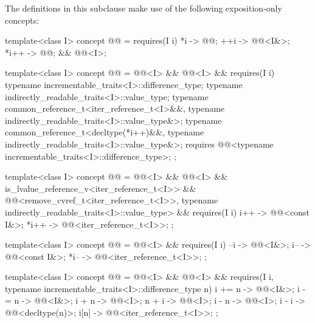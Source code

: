 \pnum
The definitions in this subclause make use of the following
exposition-only concepts:
\begin{codeblock}
template<class I>
concept @@ =
  requires(I i) {
    {   *i } -> @@;
    {  ++i } -> @@<I&>;
    { *i++ } -> @@;
  } && @@<I>;

template<class I>
concept @@ =
  @@<I> && @@<I> && requires(I i) {
    typename incrementable_traits<I>::difference_type;
    typename indirectly_readable_traits<I>::value_type;
    typename common_reference_t<iter_reference_t<I>&&,
                                typename indirectly_readable_traits<I>::value_type&>;
    typename common_reference_t<decltype(*i++)&&,
                                typename indirectly_readable_traits<I>::value_type&>;
    requires @@<typename incrementable_traits<I>::difference_type>;
  };

template<class I>
concept @@ =
  @@<I> && @@<I> &&
  is_lvalue_reference_v<iter_reference_t<I>> &&
  @@<remove_cvref_t<iter_reference_t<I>>,
          typename indirectly_readable_traits<I>::value_type> &&
  requires(I i) {
    {  i++ } -> @@<const I&>;
    { *i++ } -> @@<iter_reference_t<I>>;
  };

template<class I>
concept @@ =
  @@<I> && requires(I i) {
    {  --i } -> @@<I&>;
    {  i-- } -> @@<const I&>;
    { *i-- } -> @@<iter_reference_t<I>>;
  };

template<class I>
concept @@ =
  @@<I> && @@<I> &&
  requires(I i, typename incrementable_traits<I>::difference_type n) {
    { i += n } -> @@<I&>;
    { i -= n } -> @@<I&>;
    { i +  n } -> @@<I>;
    { n +  i } -> @@<I>;
    { i -  n } -> @@<I>;
    { i -  i } -> @@<decltype(n)>;
    {  i[n]  } -> @@<iter_reference_t<I>>;
  };
\end{codeblock}

